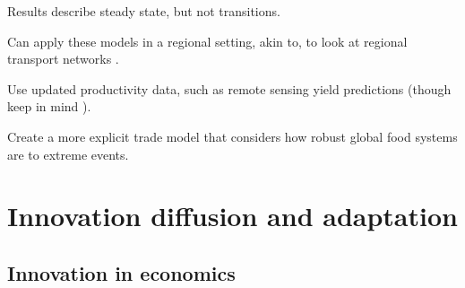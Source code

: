 \documentclass[10 pt]{article}
\begin{document}
\begin{outline}
\begin{blist}
\item Results describe steady state, but not transitions.

\end{blist}


\begin{blist}

\item Can apply these models in a regional setting, akin to, to look at regional transport networks \parencite{DH16,CD16-wp}.

\item Use updated productivity data, such as remote sensing yield predictions \parencite{BL17} (though keep in mind \cite{B18}).

\item Create a more explicit trade model that considers how robust global food systems are to extreme events. 

\end{blist}

\end{outline}

\section{Innovation diffusion and adaptation}

\subsection{Innovation in economics}
\end{document}
